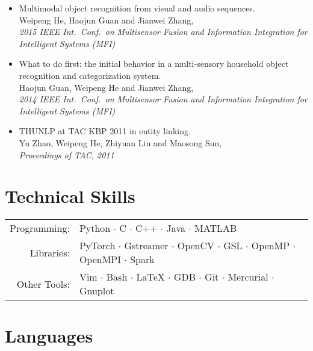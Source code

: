 \documentclass[a4paper,9pt]{article} %
\begin{document}
\begin{itemize}
  \item Multimodal object recognition from visual and audio sequences. \\
        Weipeng He, Haojun Guan and Jianwei Zhang, \\
        \textit{2015 IEEE Int.\ Conf.\ on Multisensor Fusion and Information Integration for Intelligent Systems (MFI)}

  \item What to do first: the initial behavior in a multi-sensory household object recognition and categorization system. \\
        Haojun Guan, Weipeng He and Jianwei Zhang, \\
        \textit{2014 IEEE Int.\ Conf.\ on Multisensor Fusion and Information Integration for Intelligent Systems (MFI)}

  \item THUNLP at TAC KBP 2011 in entity linking. \\
        Yu Zhao, Weipeng He, Zhiyuan Liu and Maosong Sun, \\
        \textit{Proceedings of TAC, 2011}
\end{itemize}


\section{Technical Skills}

\begin{tabular}{rl}
  Programming: & Python $\cdotp$ C $\cdotp$ C++ $\cdotp$ Java $\cdotp$ MATLAB \\
  Libraries: & PyTorch $\cdotp$ Gstreamer $\cdotp$ OpenCV $\cdotp$ GSL $\cdotp$ OpenMP $\cdotp$ OpenMPI $\cdotp$ Spark \\
  Other Tools: & Vim $\cdotp$ Bash $\cdotp$ \LaTeX{} $\cdotp$ GDB $\cdotp$ Git $\cdotp$ Mercurial $\cdotp$ Gnuplot \\
\end{tabular}


\section{Languages}
\end{document}
